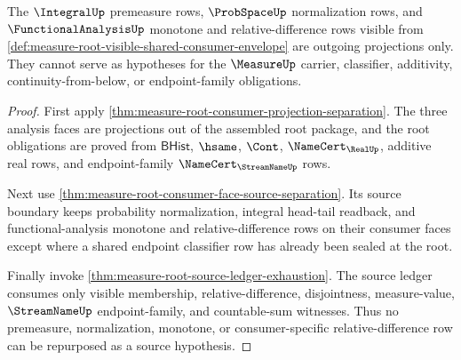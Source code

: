 \begin{theorem}
\label{thm:measure-root-visible-shared-consumer-separation}
The $\IntegralUp$ premeasure rows, $\ProbSpaceUp$ normalization rows, and
$\FunctionalAnalysisUp$ monotone and relative-difference rows visible from
\autoref{def:measure-root-visible-shared-consumer-envelope} are outgoing
projections only. They cannot serve as hypotheses for the $\MeasureUp$ carrier,
classifier, additivity, continuity-from-below, or endpoint-family obligations.
\end{theorem}
\begin{proof}
First apply \autoref{thm:measure-root-consumer-projection-separation}. The
three analysis faces are projections out of the assembled root package, and
the root obligations are proved from $\mathsf{BHist}$, $\hsame$, $\Cont$,
$\NameCert_{\RealUp}$, additive real rows, and endpoint-family
$\NameCert_{\StreamNameUp}$ rows.

Next use \autoref{thm:measure-root-consumer-face-source-separation}. Its
source boundary keeps probability normalization, integral head-tail readback,
and functional-analysis monotone and relative-difference rows on their
consumer faces except where a shared endpoint classifier row has already been
sealed at the root.

Finally invoke \autoref{thm:measure-root-source-ledger-exhaustion}. The source
ledger consumes only visible membership, relative-difference, disjointness,
measure-value, $\StreamNameUp$ endpoint-family, and countable-sum witnesses.
Thus no premeasure, normalization, monotone, or consumer-specific
relative-difference row can be repurposed as a source hypothesis.
\end{proof}

